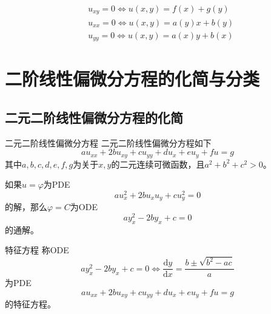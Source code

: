 \documentclass[lang = cn, scheme = chinese, thmcnt = section]{elegantbook}
\newcommand{\dd}{\mathrm{d}}           %
\begin{document}
\begin{theorem}
	\begin{align*}
		& u_{xy}=0 
		\iff 
		u(x,y)=f(x)+g(y)\\
		& u_{xx}=0
		\iff 
		u(x,y)=a(y)x+b(y)\\
		& u_{yy}=0
		\iff 
		u(x,y)=a(x)y+b(x)
	\end{align*}
\end{theorem}

\section{二阶线性偏微分方程的化简与分类}

\subsection{二元二阶线性偏微分方程的化简}

\begin{definition}{二元二阶线性偏微分方程}
	二元二阶线性偏微分方程如下
	$$
	au_{xx}
	+2bu_{xy}
	+cu_{yy}
	+du_x
	+eu_y
	+fu
	=g
	$$
	其中$a,b,c,d,e,f,g$为关于$x,y$的二元连续可微函数，且$a^2+b^2+c^2>0$。
\end{definition}

\begin{lemma}
	如果$u=\varphi$为PDE
	$$
	au_x^2+2bu_xu_y+cu_y^2=0
	$$
	的解，那么$\varphi=C$为ODE
	$$
	ay_x^2-2by_x+c=0
	$$
	的通解。
\end{lemma}

\begin{definition}{特征方程}
	称ODE
	$$
	ay_x^2-2by_x+c=0
	\iff 
	\frac{\dd y}{\dd x}=\frac{b\pm\sqrt{b^2-ac}}{a}
	$$
	为PDE
	$$
	au_{xx}
	+2bu_{xy}
	+cu_{yy}
	+du_x
	+eu_y
	+fu
	=g
	$$
	的特征方程。
\end{definition}
\end{document}
